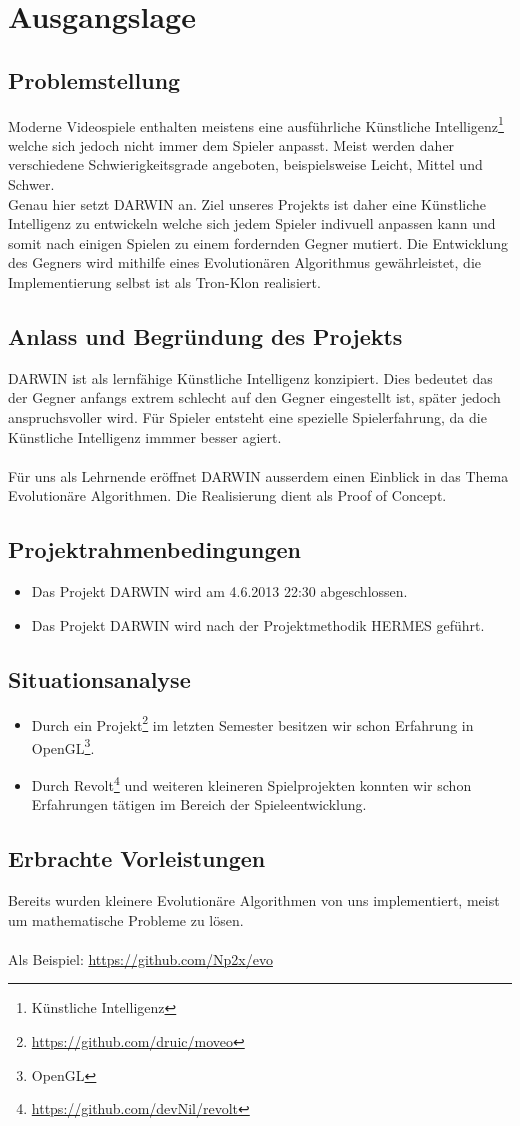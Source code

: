 \section{Ausgangslage}
\subsection{Problemstellung}
Moderne Videospiele enthalten meistens eine ausführliche Künstliche Intelligenz\footnote{Künstliche Intelligenz} welche sich jedoch nicht immer dem Spieler anpasst. Meist werden daher verschiedene Schwierigkeitsgrade angeboten, beispielsweise Leicht, Mittel und Schwer.\\
Genau hier setzt DARWIN an. Ziel unseres Projekts ist daher eine Künstliche Intelligenz zu entwickeln welche sich jedem Spieler indivuell anpassen kann und somit nach einigen Spielen zu einem fordernden Gegner mutiert. Die Entwicklung des Gegners wird mithilfe eines Evolutionären Algorithmus gewährleistet, die Implementierung selbst ist als Tron-Klon realisiert.
\subsection{Anlass und Begründung des Projekts}
DARWIN ist als lernfähige Künstliche Intelligenz konzipiert. Dies bedeutet das der Gegner anfangs extrem schlecht auf den Gegner eingestellt ist, später jedoch anspruchsvoller wird. Für Spieler entsteht eine spezielle Spielerfahrung, da die Künstliche Intelligenz immmer besser agiert. \\\\Für uns als Lehrnende eröffnet DARWIN ausserdem einen Einblick in das Thema Evolutionäre Algorithmen. Die Realisierung dient als Proof of Concept.
\subsection{Projektrahmenbedingungen}
\begin{itemize}
	\item Das Projekt DARWIN wird am 4.6.2013 22:30 abgeschlossen.
	\item Das Projekt DARWIN wird nach der Projektmethodik HERMES geführt.
\end{itemize}
\subsection{Situationsanalyse}
\begin{itemize}
	\item Durch ein Projekt\footnote{\url{https://github.com/druic/moveo}} im letzten Semester besitzen wir schon Erfahrung in
	OpenGL\footnote{OpenGL}.
	\item Durch Revolt\footnote{\url{https://github.com/devNil/revolt}} und weiteren kleineren Spielprojekten konnten wir schon Erfahrungen
	tätigen im Bereich der Spieleentwicklung.
\end{itemize}
\subsection{Erbrachte Vorleistungen}
Bereits wurden kleinere Evolutionäre Algorithmen von uns implementiert, meist um mathematische Probleme zu lösen.
\\\\ Als Beispiel: \url{https://github.com/Np2x/evo}